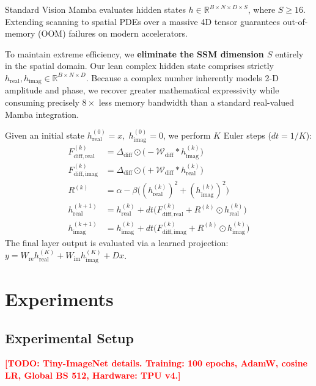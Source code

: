 \documentclass{article}
\newcommand{\todo}[1]{\textcolor{red}{\textbf{[TODO: #1]}}}
\begin{document}
Standard Vision Mamba evaluates hidden states $h \in \mathbb{R}^{B \times N \times D \times S}$, where $S \ge 16$. Extending scanning to spatial PDEs over a massive 4D tensor guarantees out-of-memory (OOM) failures on modern accelerators.

To maintain extreme efficiency, we \textbf{eliminate the SSM dimension $S$} entirely in the spatial domain. Our lean complex hidden state comprises strictly $h_{\mathrm{real}}, h_{\mathrm{imag}} \in \mathbb{R}^{B \times N \times D}$. Because a complex number inherently models 2-D amplitude and phase, we recover greater mathematical expressivity while consuming precisely $8\times$ less memory bandwidth than a standard real-valued Mamba integration.

Given an initial state $h_{\mathrm{real}}^{(0)} = x, \; h_{\mathrm{imag}}^{(0)} = 0$, we perform $K$ Euler steps ($dt = 1/K$):
\begin{align}
    F_{\mathrm{diff, real}}^{(k)} &= \Delta_{\mathrm{diff}} \odot \bigl(-\mathcal{W}_{\mathrm{diff}} * h_{\mathrm{imag}}^{(k)}\bigr) \\
    F_{\mathrm{diff, imag}}^{(k)} &= \Delta_{\mathrm{diff}} \odot \bigl(+\mathcal{W}_{\mathrm{diff}} * h_{\mathrm{real}}^{(k)}\bigr) \\
    R^{(k)} &= \alpha - \beta \bigl((h_{\mathrm{real}}^{(k)})^2 + (h_{\mathrm{imag}}^{(k)})^2\bigr) \\
    h_{\mathrm{real}}^{(k+1)} &= h_{\mathrm{real}}^{(k)} + dt \bigl( F_{\mathrm{diff, real}}^{(k)} + R^{(k)} \odot h_{\mathrm{real}}^{(k)} \bigr) \\
    h_{\mathrm{imag}}^{(k+1)} &= h_{\mathrm{imag}}^{(k)} + dt \bigl( F_{\mathrm{diff, imag}}^{(k)} + R^{(k)} \odot h_{\mathrm{imag}}^{(k)} \bigr)
\end{align}
The final layer output is evaluated via a learned projection: $y = W_{\mathrm{re}} h_{\mathrm{real}}^{(K)} + W_{\mathrm{im}} h_{\mathrm{imag}}^{(K)} + D x$.

\section{Experiments}

\subsection{Experimental Setup}
\todo{Tiny-ImageNet details. Training: 100 epochs, AdamW, cosine LR, Global BS 512, Hardware: TPU v4.}
\end{document}
